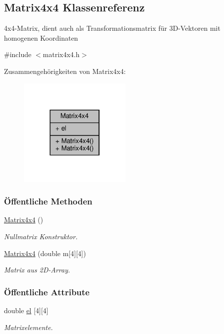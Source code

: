 \hypertarget{classMatrix4x4}{}\subsection{Matrix4x4 Klassenreferenz}
\label{classMatrix4x4}


4x4-\/\+Matrix, dient auch als Transformationsmatrix für 3\+D-\/\+Vektoren mit homogenen Koordinaten  




{\ttfamily \#include $<$matrix4x4.\+h$>$}



Zusammengehörigkeiten von Matrix4x4\+:
\nopagebreak
\begin{figure}[H]
\begin{center}
\leavevmode
\includegraphics[width=154pt]{classMatrix4x4__coll__graph}
\end{center}
\end{figure}
\subsubsection*{Öffentliche Methoden}
\begin{DoxyCompactItemize}
\item 
\mbox{\hyperlink{classMatrix4x4_a714a467ba7f85f88ebe3897b5e3580be}{Matrix4x4}} ()
\begin{DoxyCompactList}\small\item\em Nullmatrix Konstruktor. \end{DoxyCompactList}\item 
\mbox{\hyperlink{classMatrix4x4_af558f61e15acbf144471b348ae2a5258}{Matrix4x4}} (double m\mbox{[}4\mbox{]}\mbox{[}4\mbox{]})
\begin{DoxyCompactList}\small\item\em Matrix aus 2\+D-\/\+Array. \end{DoxyCompactList}\end{DoxyCompactItemize}
\subsubsection*{Öffentliche Attribute}
\begin{DoxyCompactItemize}
\item 
double \mbox{\hyperlink{classMatrix4x4_a85ef321b7e2d0b621368e4d775065833}{el}} \mbox{[}4\mbox{]}\mbox{[}4\mbox{]}
\begin{DoxyCompactList}\small\item\em Matrixelemente. \end{DoxyCompactList}\end{DoxyCompactItemize}


